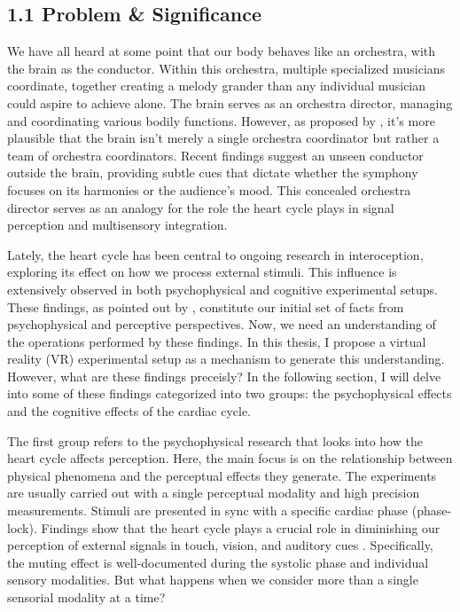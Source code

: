\documentclass[12pt,oneside,openright]{report}
\begin{document}
\subsection*{1.1 Problem \& Significance}

We have all heard at some point that our body behaves like an orchestra, with the brain as the conductor. Within this orchestra, multiple specialized musicians coordinate, together creating a melody grander than any individual musician could aspire to achieve alone. The brain serves as an orchestra director, managing and coordinating various bodily functions. However, as proposed by \cite{Morten2021}, it's more plausible that the brain isn't merely a single orchestra coordinator but rather a team of orchestra coordinators. Recent findings suggest an unseen conductor outside the brain, providing subtle cues that dictate whether the symphony focuses on its harmonies or the audience's mood. This concealed orchestra director serves as an analogy for the role the heart cycle plays in signal perception and multisensory integration.

Lately, the heart cycle has been central to ongoing research in interoception, exploring its effect on how we process external stimuli. This influence is extensively observed in both psychophysical and cognitive experimental setups. These findings, as pointed out by \cite{Barlow2012PossiblePU}, constitute our initial set of facts from psychophysical and perceptive perspectives. Now, we need an understanding of the operations performed by these findings. In this thesis, I propose a virtual reality (VR) experimental setup as a mechanism to generate this understanding. However, what are these findings preceisly? In the following section, I will delve into some of these findings categorized into two groups: the psychophysical effects and the cognitive effects of the cardiac cycle.

The first group refers to the psychophysical research that looks into how the heart cycle affects perception. Here, the main focus is on the relationship between physical phenomena and the perceptual effects they generate. The experiments are usually carried out with a single perceptual modality and high precision measurements. Stimuli are presented in sync with a specific cardiac phase (phase-lock). Findings show that the heart cycle plays a crucial role in diminishing our perception of external signals in touch, vision, and auditory cues \parencite{Sandman1977-li, esra_p, AL2021118247, Grund643, motyka, Park2014}. Specifically, the muting effect is well-documented during the systolic phase and individual sensory modalities. But what happens when we consider more than a single sensorial modality at a time?
\end{document}
